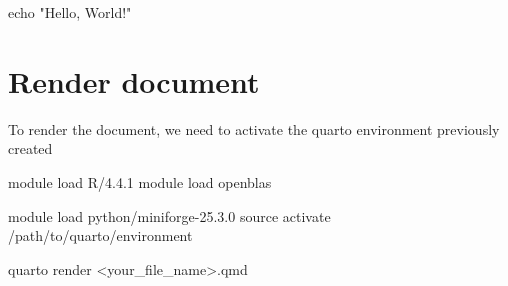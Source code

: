 \documentclass[
  letterpaper,
  DIV=11,
  numbers=noendperiod]{scrartcl}
\newenvironment{Shaded}{\begin{snugshade}}{\end{snugshade}}
\newcommand{\BuiltInTok}[1]{\textcolor[rgb]{0.00,0.23,0.31}{#1}}
\newcommand{\ExtensionTok}[1]{\textcolor[rgb]{0.00,0.23,0.31}{#1}}
\newcommand{\NormalTok}[1]{\textcolor[rgb]{0.00,0.23,0.31}{#1}}
\newcommand{\OperatorTok}[1]{\textcolor[rgb]{0.37,0.37,0.37}{#1}}
\newcommand{\StringTok}[1]{\textcolor[rgb]{0.13,0.47,0.30}{#1}}
\begin{document}
\begin{Shaded}
\begin{Highlighting}[]
\BuiltInTok{echo} \StringTok{"Hello, World!"}
\end{Highlighting}
\end{Shaded}

\section{Render document}\label{render-document}

To render the document, we need to activate the quarto environment
previously created

\begin{Shaded}
\begin{Highlighting}[]
\ExtensionTok{module}\NormalTok{ load R/4.4.1}
\ExtensionTok{module}\NormalTok{ load openblas}

\ExtensionTok{module}\NormalTok{ load python/miniforge{-}25.3.0}
\BuiltInTok{source}\NormalTok{ activate /path/to/quarto/environment}

\ExtensionTok{quarto}\NormalTok{ render }\OperatorTok{\textless{}}\NormalTok{your\_file\_name}\OperatorTok{\textgreater{}}\NormalTok{.qmd}
\end{Highlighting}
\end{Shaded}
\end{document}
